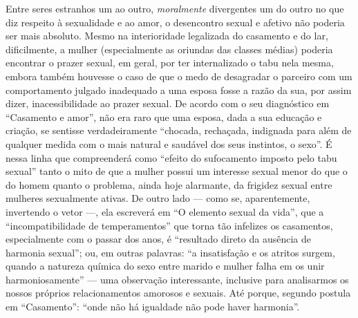 Entre seres estranhos um ao outro, \emph{moralmente} divergentes um do
outro no que diz respeito à sexualidade e ao amor, o desencontro sexual
e afetivo não poderia ser mais absoluto. Mesmo na interioridade
legalizada do casamento e do lar, dificilmente, a mulher (especialmente
as oriundas das classes médias) poderia encontrar o prazer sexual, em
geral, por ter internalizado o tabu nela mesma, embora também houvesse o
caso de que o medo de desagradar o parceiro com um comportamento julgado
inadequado a uma esposa fosse a razão da sua, por assim dizer,
inacessibilidade ao prazer sexual. De acordo com o seu diagnóstico em
``Casamento e amor'', não era raro que uma esposa, dada a sua educação e
criação, se sentisse verdadeiramente ``chocada, rechaçada, indignada
para além de qualquer medida com o mais natural e saudável dos seus
instintos, o sexo''. É nessa linha que compreenderá como ``efeito do
sufocamento imposto pelo tabu sexual'' tanto o mito de que a mulher
possui um interesse sexual menor do que o do homem quanto o problema,
ainda hoje alarmante, da frigidez sexual entre mulheres sexualmente
ativas. De outro lado --- como se, aparentemente, invertendo o vetor ---,
ela escreverá em ``O elemento sexual da vida'', que a
``incompatibilidade de temperamentos'' que torna tão infelizes os
casamentos, especialmente com o passar dos anos, é ``resultado direto da
ausência de harmonia sexual''; ou, em outras palavras: ``a insatisfação
e os atritos surgem, quando a natureza química do sexo entre marido e
mulher falha em os unir harmoniosamente'' --- uma observação
interessante, inclusive para analisarmos os nossos próprios
relacionamentos amorosos e sexuais. Até porque, segundo postula em
``Casamento'': ``onde não há igualdade não pode haver harmonia''.

